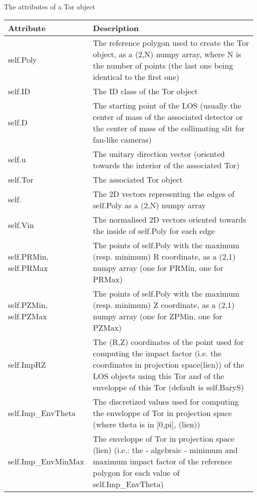 \documentclass[letterpaper,10pt,english]{sphinxmanual}
\begin{document}
\begin{threeparttable}
\capstart\caption{The attributes of a Tor object}

\begin{tabulary}{\linewidth}{|L|L|}
\hline
\textbf{
Attribute
} & \textbf{
Description
}\\\hline

self.Poly
 & 
The reference polygon used to create the Tor object, as a (2,N) numpy array, where N is the number of points (the last one being identical to the first one)
\\\hline

self.ID
 & 
The ID class of the Tor object
\\\hline

self.D
 & 
The starting point of the LOS (usually the center of mass of the associated detector or the center of mass of the collimating slit for fan-like cameras)
\\\hline

self.u
 & 
The unitary direction vector (oriented towards the interior of the associated Tor)
\\\hline

self.Tor
 & 
The associated Tor object
\\\hline

self.
 & 
The 2D vectors representing the edges of self.Poly as a (2,N) numpy array
\\\hline

self.Vin
 & 
The normalised 2D vectors oriented towards the inside of self.Poly for each edge
\\\hline

self.PRMin, self.PRMax
 & 
The points of self.Poly with the maximum (resp. minimum) R coordinate, as a (2,1) numpy array (one for PRMin, one for PRMax)
\\\hline

self.PZMin, self.PZMax
 & 
The points of self.Poly with the maximum (resp. minimum) Z coordinate, as a (2,1) numpy array (one for ZPMin, one for PZMax)
\\\hline

self.ImpRZ
 & 
The (R,Z) coordinates of the point used for computing the impact factor (i.e. the coordinates in projection space(lien)) of the LOS objects using this Tor and of the enveloppe of this Tor (default is self.BaryS)
\\\hline

self.Imp\_EnvTheta
 & 
The discretized values used for computing the enveloppe of Tor in projection space (where theta is in {[}0,pi{]}, (lien))
\\\hline

self.Imp\_EnvMinMax
 & 
The enveloppe of Tor in projection space (lien) (i.e.: the - algebraic - minimum and maximum impact factor of the reference polygon for each value of self.Imp\_EnvTheta)
\\\hline
\end{tabulary}

\end{threeparttable}
\end{document}
